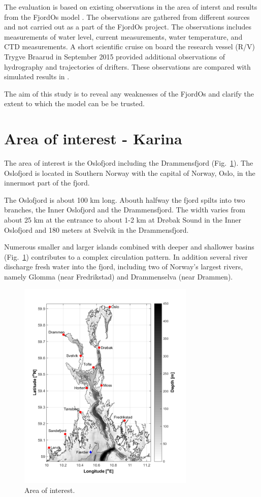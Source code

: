 \documentclass[12pt,a4paper,english]{article}
\begin{document}
The evaluation is based on existing observations in the area of interst and results from the FjordOs model \citep{roed:etal:2016}. The observations are gathered from different sources and not carried out as a part of the FjordOs project. The observations includes measurements of water level, current measurements, water temperature, and CTD measurements. A short scientific cruise on board the research vessel (R/V) Trygve Braarud in September 2015 provided additional observations of hydrography and trajectories of drifters. These observations are compared with simulated results in \cite{hjelm:etal:2016}.

The aim of this study is to reveal any weaknesses of the FjordOs and clarify the extent to which the model can be be trusted.


\section{Area of interest - Karina}
The area of interest is the Oslofjord including the Drammensfjord (Fig.~\ref{fig:kart}). The Oslofjord is located in Southern Norway with the capital of Norway, Oslo, in the innermost part of the fjord. 

The Oslofjord is about 100 km long. Abouth halfway the fjord spilts into two branches, the Inner Oslofjord and the Drammensfjord. The width varies from about 25 km at the entrance to about 1-2 km at Dr\o bak Sound in the Inner Oslofjord and 180 meters at Svelvik in the Drammensfjord.

Numerous smaller and larger islands combined with deeper and shallower basins (Fig.~\ref{fig:kart}) contributes to a complex circulation pattern. In addition several river discharge fresh water into the fjord, including two of Norway's largest rivers, namely Glomma (near Fredrikstad) and Drammenselva (near Drammen).

\begin{figure}[t]
\centerline{
\includegraphics*[trim=0cm 0.8cm 0cm 0cm,clip=true,width=0.75\textwidth]{Figurer/kart}
}
\caption{\small
Area of interest. 
}
\label{fig:kart}
\end{figure}
\end{document}

